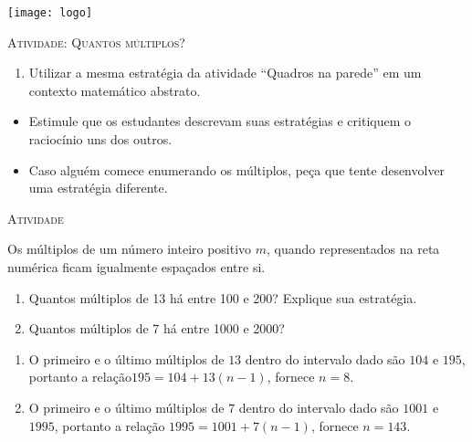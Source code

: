 \documentclass[10 pt,usenames,dvipsnames, oneside]{article}
\begin{document}
\begin{center}
  \begin{minipage}[l]{3cm}
\texttt{[image: logo]}    
\end{minipage}\hfill
\begin{minipage}[r]{.8\textwidth}
 {\Large \scshape Atividade: Quantos múltiplos?}  
\end{minipage}
\end{center}
\vspace{.2cm}

\ifdefined\prof
\begin{objetivos}
\item \phantom{a}
\end{objetivos}

\begin{goals}
\begin{enumerate}
\item Utilizar a mesma estratégia da atividade “Quadros na parede” em um contexto matemático abstrato.
\end{enumerate}

\tcblower
\begin{itemize}
\item Estimule que os estudantes descrevam suas estratégias e critiquem o raciocínio uns dos outros.
\item Caso alguém comece enumerando os múltiplos, peça que tente desenvolver uma estratégia diferente.

\end{itemize}

\end{goals}

\bigskip
\begin{center}
{\large \scshape Atividade}
\end{center}
\fi

Os múltiplos de um número inteiro positivo $m$, quando representados na reta numérica ficam igualmente espaçados entre si.
\begin{enumerate}
\item Quantos múltiplos de 13 há entre 100 e 200? Explique sua estratégia.
\item Quantos múltiplos de 7 há entre 1000 e 2000?
\end{enumerate}


\ifdefined\prof
\begin{solucao}
\begin{enumerate}
\item O primeiro e o último múltiplos de $13$ dentro do intervalo dado são $104$ e $195$, portanto a relação$ 195=104+13(n-1)$, fornece $n=8$.
\item O primeiro e o último múltiplos de $7$ dentro do intervalo dado são $1001$ e $1995$, portanto a relação $1995=1001+7(n-1)$, fornece $n=143$.


\end{enumerate}
\end{solucao}
\fi
\end{document}
